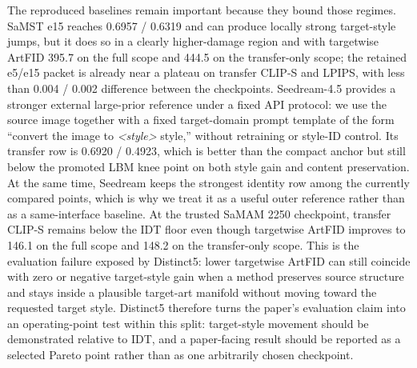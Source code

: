 \documentclass[letterpaper]{article}
\begin{document}
The reproduced baselines remain important because they bound those regimes. SaMST e15 reaches 0.6957 / 0.6319 and can produce locally strong target-style jumps, but it does so in a clearly higher-damage region and with targetwise ArtFID 395.7 on the full scope and 444.5 on the transfer-only scope; the retained e5/e15 packet is already near a plateau on transfer CLIP-S and LPIPS, with less than 0.004 / 0.002 difference between the checkpoints. Seedream-4.5 provides a stronger external large-prior reference under a fixed API protocol: we use the source image together with a fixed target-domain prompt template of the form ``convert the image to \textit{<style>} style,'' without retraining or style-ID control. Its transfer row is 0.6920 / 0.4923, which is better than the compact anchor but still below the promoted LBM knee point on both style gain and content preservation. At the same time, Seedream keeps the strongest identity row among the currently compared points, which is why we treat it as a useful outer reference rather than as a same-interface baseline. At the trusted SaMAM 2250 checkpoint, transfer CLIP-S remains below the IDT floor even though targetwise ArtFID improves to 146.1 on the full scope and 148.2 on the transfer-only scope. This is the evaluation failure exposed by Distinct5: lower targetwise ArtFID can still coincide with zero or negative target-style gain when a method preserves source structure and stays inside a plausible target-art manifold without moving toward the requested target style. Distinct5 therefore turns the paper's evaluation claim into an operating-point test within this split: target-style movement should be demonstrated relative to IDT, and a paper-facing result should be reported as a selected Pareto point rather than as one arbitrarily chosen checkpoint.
\end{document}
